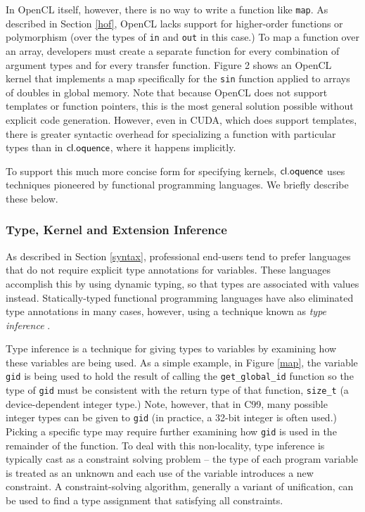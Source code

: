 \documentclass[10pt, conference, compsocconf]{IEEEtran}
\begin{document}
In OpenCL itself, however, there is no way to write a function like \verb|map|. As described in Section \ref{hof}, OpenCL lacks support for higher-order functions or polymorphism (over the types of \verb|in| and \verb|out| in this case.) To map a function over an array, developers must create a separate function for every combination of argument types and for every transfer function. Figure 2 shows an OpenCL kernel that implements a map specifically for the \verb|sin| function applied to arrays of doubles in global memory. Note that because OpenCL does not support templates or function pointers, this is the most general solution possible without explicit code generation. However, even in CUDA, which does support templates, there is greater syntactic overhead for specializing a function with particular types than in $\textsf{cl.oquence}$, where it happens implicitly.

To support this much more concise form for specifying kernels, $\textsf{cl.oquence}$ uses techniques pioneered by functional programming languages. We briefly describe these below.

\subsubsection{Type, Kernel and Extension Inference}
As described in Section \ref{syntax}, professional end-users tend to prefer languages that do not require explicit type annotations for variables. These languages accomplish this by using dynamic typing, so that types are associated with values instead. Statically-typed functional programming languages have also eliminated type annotations in many cases, however, using a technique known as {\it type inference} \cite{tapl}. 

Type inference is a technique for giving types to variables by examining how these variables are being used. As a simple example, in Figure \ref{map}, the variable \verb|gid| is being used to hold the result of calling the \verb|get_global_id| function so the type of \verb|gid| must be consistent with the return type of that function, \verb|size_t| (a device-dependent integer type.) Note, however, that in C99, many possible integer types can be given to \verb|gid| (in practice, a 32-bit integer is often used.) Picking a specific type may require further examining how \verb|gid| is used in the remainder of the function. 
To deal with this non-locality, type inference is typically cast as a constraint solving problem -- the type of each program variable is treated as an unknown and each use of the variable introduces a new constraint. A constraint-solving algorithm, generally a variant of unification, can be used to find a type assignment that satisfying all constraints.
\end{document}
